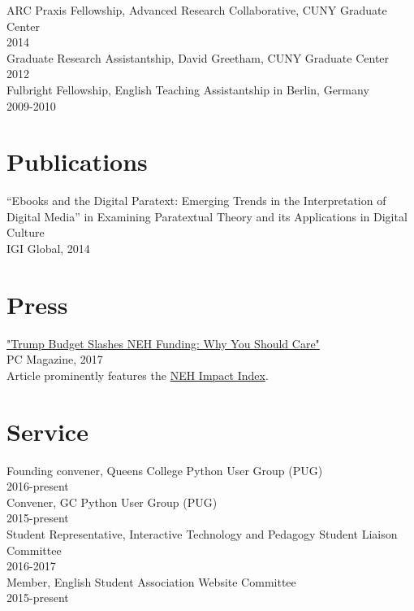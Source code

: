 \documentclass[11pt]{article}
\begin{document}
ARC Praxis Fellowship, Advanced Research Collaborative, CUNY Graduate Center\\
2014\\

Graduate Research Assistantship, David Greetham, CUNY Graduate Center\\
2012\\

Fulbright Fellowship, English Teaching Assistantship in Berlin, Germany\\
2009-2010\\

\section*{Publications}
\label{sec:orgheadline3}
“Ebooks and the Digital Paratext: Emerging Trends in the Interpretation of Digital Media” in Examining Paratextual Theory and its Applications in Digital Culture\\
IGI Global, 2014\\

\section*{Press}
\label{sec:orgheadline4}
\href{http://www.pcmag.com/commentary/353904/trump-budget-slashes-neh-funding-why-you-should-care}{"Trump Budget Slashes NEH Funding: Why You Should Care"}\\
PC Magazine, 2017\\

Article prominently features the \href{http://www.nehimpact.org/}{NEH Impact Index}.\\
\section*{Service}
\label{sec:orgheadline5}
Founding convener, Queens College Python User Group (PUG)\\
2016-present\\

Convener, GC Python User Group (PUG)\\
2015-present\\

Student Representative, Interactive Technology and Pedagogy Student Liaison Committee\\
2016-2017\\

Member, English Student Association Website Committee\\
2015-present\\
\end{document}
